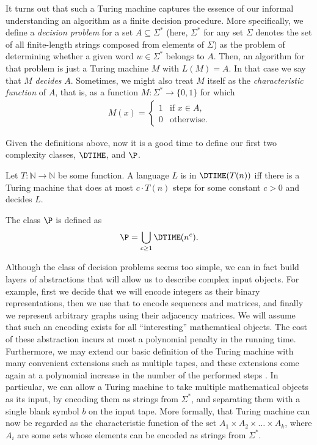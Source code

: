\documentclass[12pt,a4paper,titlepage,openany]{report}
\begin{document}
It turns out that such a Turing machine captures the essence of our informal understanding an algorithm as a finite decision procedure. More specifically, we define a \emph{decision problem} for a set $A \subseteq \Sigma ^*$ (here, $\Sigma^*$ for any set $\Sigma$ denotes the set of all finite-length strings composed from elements of $\Sigma$) as the problem of determining whether a given word $w \in \Sigma ^*$ belongs to $A$. Then, an algorithm for that problem is just a Turing machine $M$ with $L(M) = A$. In that case we say that $M$ \emph{decides} $A$. Sometimes, we might also treat $M$ itself as the \emph{characteristic function} of $A$, that is, as a function $M: \Sigma ^* \to \{0, 1\}$ for which
\begin{align}
	M(x) = \begin{cases}
		1 & \text{if } x \in A, \\
		0 & \text{otherwise.}
	\end{cases}
\end{align}

Given the definitions above, now it is a good time to define our first two complexity classes, $\DTIME$, and $\P$.

\begin{definition}
	Let $T:\mathbb N \to \mathbb N$ be some function. A language $L$ is in $\DTIME(T(n))$ iff there is a Turing machine that does at most $c \cdot T(n)$ steps for some constant $c > 0$ and decides $L$.
\end{definition}

\begin{definition}
	 The class $\P$ is defined as
	 \begin{align}
	 	\P = \bigcup_{c\geq 1} \DTIME (n^c).
	 \end{align}
\end{definition}

Although the class of decision problems seems too simple, we can in fact build layers of abstractions that will allow us to describe complex input objects. For example, first we decide that we will encode integers as their binary representations, then we use that to encode sequences and matrices, and finally we represent arbitrary graphs using their adjacency matrices. We will assume that such an encoding exists for all ``interesting'' mathematical objects. The cost of these abstraction incurs at most a polynomial penalty in the running time. Furthermore, we may extend our basic definition of the Turing machine with many convenient extensions such as multiple tapes, and these extensions come again at a polynomial increase in the number of the performed steps \cite{arora2009computational}. In particular, we can allow a Turing machine to take multiple mathematical objects as its input, by encoding them as strings from $\Sigma^*$, and separating them with a single blank symbol $b$ on the input tape. More formally, that Turing machine can now be regarded as the characteristic function of the set $A_1 \times A_2 \times \dots \times A_k$, where $A_i$ are some sets whose elements can be encoded as strings from $\Sigma^*$.
\end{document}
